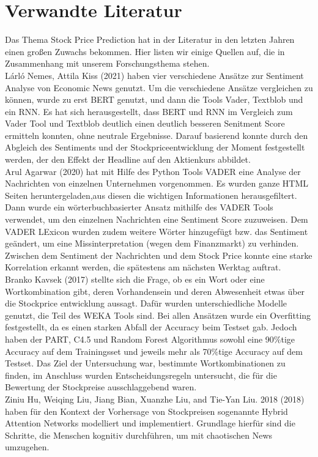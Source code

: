 \section*{Verwandte Literatur}
Das Thema Stock Price Prediction hat in der Literatur in den letzten Jahren einen großen Zuwachs bekommen. Hier listen wir einige Quellen auf, die in Zusammenhang mit unserem Forschungsthema stehen.\\
Lárló Nemes, Attila Kiss (2021) haben vier verschiedene Ansätze zur Sentiment Analyse von Economic News genutzt. Um die verschiedene Ansätze vergleichen zu können, wurde zu erst BERT genutzt, und dann die Tools Vader, Textblob und ein RNN. Es hat sich herausgestellt, dass BERT und RNN im Vergleich zum Vader Tool und Textblob deutlich einen deutlich besseren Senitment Score ermitteln konnten, ohne neutrale Ergebnisse. Darauf basierend konnte durch den Abgleich des Sentiments und der Stockpriceentwicklung der Moment festgestellt werden, der den Effekt der Headline auf den Aktienkurs abbildet.\\
Arul Agarwar (2020) hat mit Hilfe des Python Tools VADER eine Analyse der Nachrichten von einzelnen Unternehmen vorgenommen. Es wurden ganze HTML Seiten heruntergeladen,aus diesen die wichtigen Informationen herausgefiltert. Dann wurde ein wörterbuchbasierter Ansatz mithilfe des VADER Tools verwendet, um den einzelnen Nachrichten eine Sentiment Score zuzuweisen. Dem VADER LExicon wurden zudem weitere Wörter hinzugefügt bzw. das Sentiment geändert, um eine Missinterpretation (wegen dem Finanzmarkt) zu verhinden. Zwischen dem Sentiment der Nachrichten und dem Stock Price konnte eine starke Korrelation erkannt werden, die spätestens am nächsten Werktag auftrat.\\
Branko Kavsek (2017) stellte sich die Frage, ob es ein Wort oder eine Wortkombination gibt, deren Vorhandensein und deren Abwesenheit etwas über die Stockprice entwicklung aussagt. Dafür wurden unterschiedliche Modelle genutzt, die Teil des WEKA Tools sind. Bei allen Ansätzen wurde ein Overfitting festgestellt, da es einen starken Abfall der Accuracy beim Testset gab. Jedoch haben der PART, C4.5 und Random Forest Algorithmus sowohl eine 90\%tige Accuracy auf dem Trainingsset und jeweils mehr als 70\%tige Accuracy auf dem Testset. Das Ziel der Untersuchung war, bestimmte Wortkombinationen zu finden, im Anschluss wurden Entscheidungsregeln untersucht, die für die Bewertung der Stockpreise ausschlaggebend waren.\\
Ziniu Hu, Weiqing Liu, Jiang Bian, Xuanzhe Liu, and Tie-Yan Liu. 2018 (2018) haben für den Kontext der Vorhersage von Stockpreisen sogenannte Hybrid Attention Networks modelliert und implementiert. Grundlage hierfür sind die Schritte, die Menschen kognitiv durchführen, um mit chaotischen News umzugehen.\\
